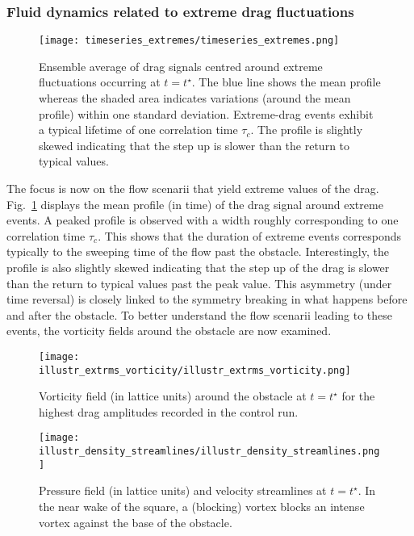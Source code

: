 \subsubsection{Fluid dynamics related to extreme drag fluctuations}
\label{sec:dynamical_aspects}

\begin{figure}
	\centering
	\texttt{[image: timeseries\_extremes/timeseries\_extremes.png]}
	\caption{\label{fig:timeseries_extremes} Ensemble average of drag signals centred around extreme fluctuations occurring  at $t=t^{\star}$. The blue line shows the mean profile whereas the shaded area indicates variations (around the mean profile) within one standard deviation. Extreme-drag events exhibit a typical lifetime of one correlation time $\tau_c$. The profile is slightly skewed indicating that the step up is slower than the return to typical values.}
\end{figure}

%
The focus is now on the flow scenarii that yield extreme values of the drag.
Fig.~\ref{fig:timeseries_extremes} displays the mean profile (in time) of the drag signal around extreme events. A peaked profile is observed with a width roughly corresponding to one correlation time $\tau_c$. This shows that the duration of extreme events corresponds typically to the sweeping time of the flow past the obstacle.
Interestingly, the profile is also slightly skewed indicating that the step up of the drag is slower than the return to typical values past the peak value.
This asymmetry (under time reversal) is closely linked to the symmetry breaking in what happens before and after the obstacle.
To better understand the flow scenarii leading to these events, the vorticity fields around the obstacle are now examined.

\begin{figure}
  \centering
  \texttt{[image: illustr\_extrms\_vorticity/illustr\_extrms\_vorticity.png]}
  \caption{\label{fig:top_4_events_vorticity} Vorticity field (in lattice units) around the obstacle at $t=t^{\star}$ for the highest drag amplitudes recorded in the control run.
  }
\end{figure}

\begin{figure}
  \centering
  \texttt{[image: illustr\_density\_streamlines/illustr\_density\_streamlines.png]}
  \caption{\label{fig:density+streamlines} Pressure field (in lattice units) and velocity streamlines at $t=t^{\star}$. In the near wake of the square, a (blocking) vortex blocks an intense vortex against the base of the obstacle.}
\end{figure}

